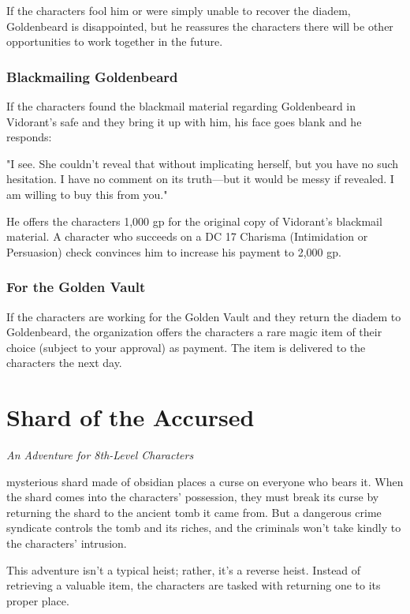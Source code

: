 \documentclass[10pt,a4paper,twoside,bg=print,twocolumn,openany,nodeprecatedcode]{dndbook}
\begin{document}
If the characters fool him or were simply unable to recover the diadem, Goldenbeard is disappointed, but he reassures the characters there will be other opportunities to work together in the future.

\subsection{Blackmailing Goldenbeard}
If the characters found the blackmail material regarding Goldenbeard in Vidorant's safe and they bring it up with him, his face goes blank and he responds:

\begin{DndReadAloud}{}
"I see. She couldn't reveal that without implicating herself, but you have no such hesitation. I have no comment on its truth—but it would be messy if revealed. I am willing to buy this from you."

\end{DndReadAloud}

He offers the characters 1,000 gp for the original copy of Vidorant's blackmail material. A character who succeeds on a DC 17 Charisma (Intimidation or Persuasion) check convinces him to increase his payment to 2,000 gp.

\subsection{For the Golden Vault}
If the characters are working for the Golden Vault and they return the diadem to Goldenbeard, the organization offers the characters a rare magic item of their choice (subject to your approval) as payment. The item is delivered to the characters the next day.

\chapter{Shard of the Accursed}
\textit{An Adventure for 8th-Level Characters}

 mysterious shard made of obsidian places a curse on everyone who bears it. When the shard comes into the characters' possession, they must break its curse by returning the shard to the ancient tomb it came from. But a dangerous crime syndicate controls the tomb and its riches, and the criminals won't take kindly to the characters' intrusion.


This adventure isn't a typical heist; rather, it's a reverse heist. Instead of retrieving a valuable item, the characters are tasked with returning one to its proper place.
\end{document}
